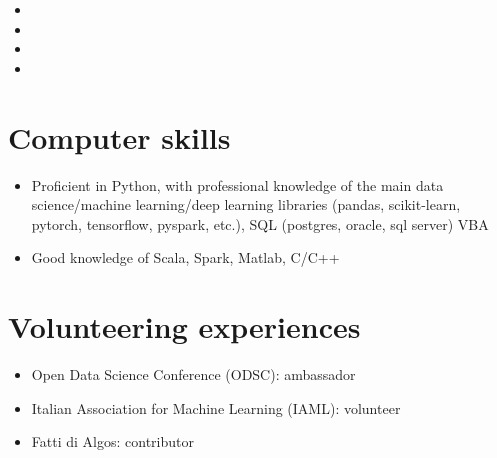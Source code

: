 \documentclass[11pt,a4paper,sans]{moderncv}        %
\begin{document}
\begin{itemize}

\item{}

\item{}

\item{}

\item{}

\end{itemize}

\section{Computer skills}
\begin{itemize}
\item Proficient in Python, with professional knowledge of the main data science/machine learning/deep learning libraries (pandas, scikit-learn, pytorch, tensorflow, pyspark, etc.), SQL (postgres, oracle, sql server) VBA
\item Good knowledge of Scala, Spark, Matlab, C/C++ 
\end{itemize}

%
\section{Volunteering experiences}
\begin{itemize}
 \item Open Data Science Conference (ODSC): ambassador
 \item Italian Association for Machine Learning (IAML): volunteer
 \item Fatti di Algos: contributor
\end{itemize} 
\end{document}
